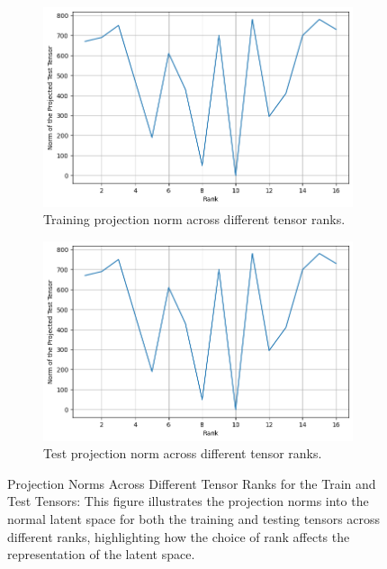 \documentclass[preprint,12pt,authoryear]{elsarticle}
\begin{document}
\begin{figure}[H]
    \centering
    \begin{subfigure}[t]{0.48\linewidth}
        \centering
        \includegraphics[width=\linewidth]{projection test plot.png}
        \caption{Training projection norm across different tensor ranks.}
        \label{fig:train-error}
    \end{subfigure}
    \hfill
    \begin{subfigure}[t]{0.48\linewidth}
        \centering
        \includegraphics[width=\linewidth]{projection test plot.png}
        \caption{Test projection norm across different tensor ranks.}
        \label{fig:test-error}
    \end{subfigure}
    \caption{Projection Norms Across Different Tensor Ranks for the Train and Test Tensors: This figure illustrates the projection norms into the normal latent space for both the training and testing tensors across different ranks, highlighting how the choice of rank affects the representation of the latent space.}
    \label{fig:projection-norms}
\end{figure}
\end{document}
